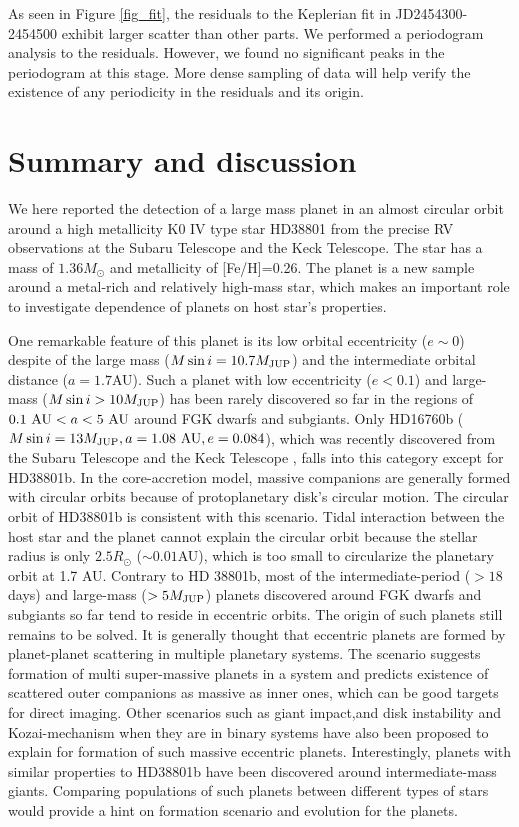 \documentclass[manuscript]{aastex}
\newcommand{\msini}{M \sin i}
\newcommand{\mjup}{M_{\rm JUP}}
\begin{document}
As seen in Figure \ref{fig_fit}, the residuals to the Keplerian fit in JD2454300-2454500 exhibit larger scatter than other parts.
We performed a periodogram analysis \citep{1982ApJ...263..835S} to the residuals.
However, we found no significant peaks in the periodogram at this stage.
More dense sampling of data will help verify the existence of any periodicity in the residuals and its origin.

\section{Summary and discussion}
\label{sec_sum}
We here reported the detection of a large mass planet in an almost circular orbit around a high metallicity K0 IV type star HD38801 from the precise RV observations at the Subaru Telescope and the Keck Telescope.
The star has a mass of $1.36M_{\odot}$ and metallicity of [Fe/H]=0.26.
The planet is a new sample around a metal-rich and relatively high-mass star, which makes an important role to investigate dependence of planets on host star's properties.

One remarkable feature of this planet is its low orbital eccentricity ($e\sim 0$) despite of the large mass ($\msini =10.7\mjup$) and the intermediate orbital distance ($a=1.7$AU). 
Such a planet with low eccentricity ($e<0.1$) and large-mass ($\msini > 10\mjup$) has been rarely discovered so far in the regions of $0.1\ {\rm AU}<a<5\ {\rm AU}$ around FGK dwarfs and subgiants.
Only HD16760b ($\msini=13\mjup, a=1.08\ {\rm AU}, e=0.084$), which was recently discovered from the Subaru Telescope and the Keck Telescope \citep{2009A&A...505..853B, 2009ApJ...703..671S}, falls into this category except for HD38801b.
In the core-accretion model, massive companions are generally formed with circular orbits because of protoplanetary disk's circular motion. The circular orbit of HD38801b is consistent with this scenario.
Tidal interaction between the host star and the planet cannot explain the circular orbit because the stellar radius is only $2.5R_{\odot}$ ($\sim0.01$AU), which is too small to circularize the planetary orbit
at 1.7 AU.
Contrary to HD 38801b, most of the intermediate-period ($>18$ days) and large-mass ($>5\mjup$) planets discovered around FGK dwarfs and subgiants so far tend to reside in eccentric orbits.
The origin of such planets still remains to be solved. It is generally thought that eccentric planets are formed by planet-planet scattering in multiple planetary systems.
The scenario suggests formation of multi super-massive planets in a system and predicts existence of scattered outer companions as massive as inner ones, which can be good targets for direct imaging.
Other scenarios such as giant impact\citep{2008A&A...482..315B},and disk instability\citep{1998ApJ...503..923B} and Kozai-mechanism when they are in binary systems \citep{1962AJ.....67..591K} have also been proposed to explain for formation of such massive eccentric planets.
Interestingly, planets with similar properties to HD38801b have been discovered around intermediate-mass giants.
Comparing populations of such planets between different types of stars would provide a hint on formation scenario and evolution for the planets.
\end{document}

